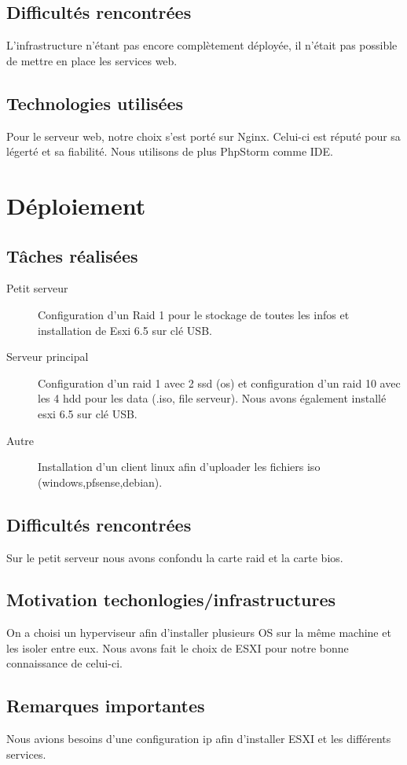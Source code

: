 \documentclass{article}
\begin{document}
    \subsection{Difficultés rencontrées} 
    
    L'infrastructure n'étant pas encore complètement déployée, il n'était pas possible de mettre en place les services web.
    \subsection{Technologies utilisées}
    Pour le serveur web, notre choix s'est porté sur Nginx. Celui-ci est réputé pour sa légerté et sa fiabilité.
    Nous utilisons de plus PhpStorm comme IDE.

\section{Déploiement}
    \subsection{Tâches réalisées} 
        \begin{description}
            \item[Petit serveur] Configuration d'un Raid 1 pour le stockage de toutes les     infos et installation de Esxi 6.5 sur clé USB.
            \item[Serveur principal]
            Configuration d'un raid 1 avec 2 ssd (os) et configuration d'un raid 10 avec les 4     hdd pour les data (.iso, file serveur). Nous avons également installé esxi 6.5 sur     clé USB.
            \item[Autre]
            Installation d'un client linux afin d'uploader les fichiers iso     (windows,pfsense,debian).
        \end{description}
    \subsection{Difficultés rencontrées}
    Sur le petit serveur nous avons confondu la carte raid et la carte bios.
    \subsection{Motivation techonlogies/infrastructures}
    On a choisi un hyperviseur afin d'installer plusieurs OS sur la même machine et les isoler entre eux. Nous avons fait le choix de ESXI pour notre bonne connaissance de celui-ci.
    \subsection{Remarques importantes}
    Nous avions besoins d'une configuration ip afin d'installer ESXI et les différents     services.
\end{document}
